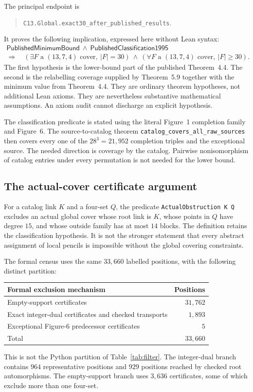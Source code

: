 \documentclass[11pt]{article}
\theoremstyle{definition}
\theoremstyle{remark}
\begin{document}
The principal endpoint is
\begin{quote}\small
\texttt{C13.Global.exact30\_after\_published\_results}.
\end{quote}
It proves the following implication, expressed here without Lean
syntax:
\[
\begin{gathered}
\mathsf{PublishedMinimumBound}\ \wedge\
\mathsf{PublishedClassification1995}\\
\Longrightarrow\quad
\left(\exists F\text{ a $(13,7,4)$ cover},\ |F|=30\right)
\ \wedge\
\left(\forall F\text{ a $(13,7,4)$ cover},\ |F|\ge30\right).
\end{gathered}
\]
The first hypothesis is the lower-bound part of the published
Theorem~4.4. The second is the relabelling coverage supplied by
Theorem~5.9 together with the minimum value from Theorem~4.4.
They are ordinary theorem hypotheses, not additional Lean axioms.
They are nevertheless substantive mathematical assumptions. An
axiom audit cannot discharge an explicit hypothesis.

The classification predicate is stated using the literal Figure~1
completion family and Figure~6. The source-to-catalog theorem
\texttt{catalog\_covers\_all\_raw\_sources} then covers every one
of the $28^3=21{,}952$ completion triples and the exceptional source.
The needed direction is coverage by the catalog. Pairwise
nonisomorphism of catalog entries under every permutation is not
needed for the lower bound.

\subsection{The actual-cover certificate argument}
For a catalog link $K$ and a four-set $Q$, the predicate
\texttt{ActualObstruction K Q} excludes an actual global cover
whose root link is $K$, whose points in $Q$ have degree $15$, and
whose outside family has at most $14$ blocks. The definition
retains the classification hypothesis. It is not the stronger
statement that every abstract assignment of local pencils is
impossible without the global covering constraints.

The formal census uses the same $33{,}660$ labelled positions, with
the following distinct partition:
\begin{center}
\begin{tabular}{@{}lr@{}}
\toprule
Formal exclusion mechanism & Positions\\
\midrule
Empty-support certificates & $31{,}762$\\
Exact integer-dual certificates and checked transports & $1{,}893$\\
Exceptional Figure-6 predecessor certificates & $5$\\
\midrule
Total & $33{,}660$\\
\bottomrule
\end{tabular}
\end{center}
This is not the Python partition of Table~\ref{tab:filter}.
The integer-dual branch contains $964$ representative positions
and $929$ positions reached by checked root automorphisms.
The empty-support branch uses $3{,}636$ certificates, some of
which exclude more than one four-set.
\end{document}
